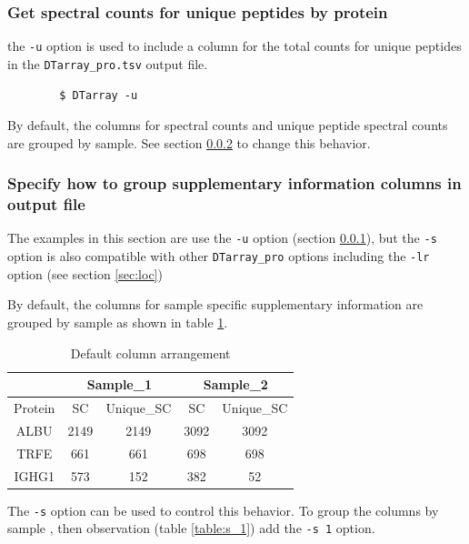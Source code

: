 \documentclass[12pt]{article}
\begin{document}
	\subsubsection{Get spectral counts for unique peptides by protein} \label{sec:unique_sc}
	
	the \texttt{-u} option is used to include a column for the total counts for unique peptides in the \texttt{DTarray\_pro.tsv} output file.
	
	\begin{lstlisting}
		$ DTarray -u
	\end{lstlisting}
	
	By default, the columns for spectral counts and unique peptide spectral counts are grouped by sample.  See section \ref{sec:sup_info} to change this behavior.  
	
	\subsubsection{Specify how to group supplementary information columns in output file} \label{sec:sup_info}
	
	The examples in this section are use the \texttt{-u} option (section \ref{sec:unique_sc}), but the \texttt{-s} option is also compatible with other \texttt{DTarray\_pro} options including the \texttt{-lr} option (see section \ref{sec:loc})
	
	\bigskip
	\noindent
	By default, the columns for sample specific supplementary information are grouped by sample as shown in table \ref{table:s_0}.  
	
	\bigskip
	\begin{table}[h!]
		\centering
		\footnotesize
		\begin{tabular}{ccccc}
			\toprule
			& \multicolumn{2}{c}{Sample\_1}
			& \multicolumn{2}{c}{Sample\_2} \\
			\midrule
			Protein & SC & Unique\_SC & SC & Unique\_SC \\ 
			\midrule
			ALBU & 2149 & 2149 & 3092 & 3092 \\
			TRFE & 661 & 661 & 698 & 698 \\ 
			IGHG1 & 573 & 152 & 382 & 52 \\ 
			\toprule
		\end{tabular}
		\caption{Default column arrangement}
		\label{table:s_0}
	\end{table}
	
	\noindent
	The \texttt{-s} option can be used to control this behavior. To group the columns by sample , then observation (table \ref{table:s_1}) add the \texttt{-s 1} option.
	
\end{document}
